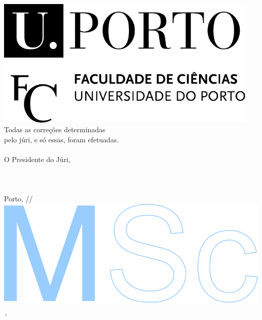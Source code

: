 \documentclass[11pt]{article}
\begin{document}
\begin{flushright}
	\vspace*{\fill}
	\begin{minipage}[b]{54mm}
		\includegraphics[width=0.95\textwidth]{fcup}
		\\[0.5em]
		{ \footnotesize Todas as correções determinadas \\
			pelo júri, e só essas, foram efetuadas. \\
			\\
			O Presidente do Júri, \\
			\\ 
			\\
			\\
			Porto, \underline{\qquad\quad}/\underline{\quad\qquad}/\underline{\qquad\qquad} \\
		}
		\includegraphics[scale=0.97]{msc}
	\end{minipage}
	\vspace*{1mm}
\end{flushright}

\newpage
´



\end{document}
